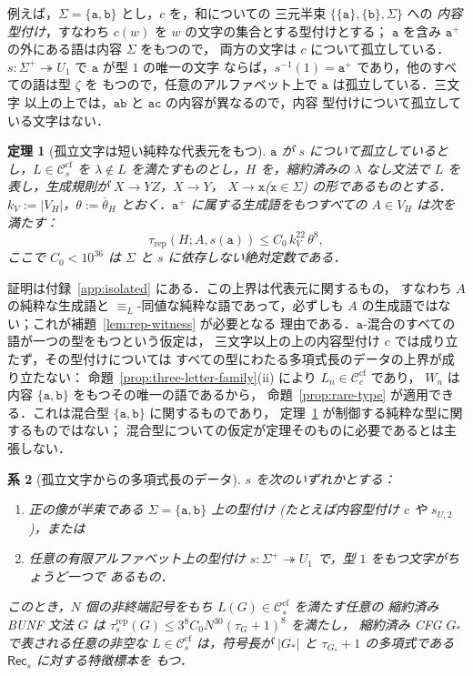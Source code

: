 \documentclass[11pt,a4paper]{ltjsarticle}
\numberwithin{equation}{section}
\theoremstyle{plain}
\newtheorem{theorem}{定理}[section]
\newtheorem{corollary}[theorem]{系}
\theoremstyle{definition}
\theoremstyle{remark}
\theoremstyle{plain}
\newcommand{\cf}{\mathrm{cf}}
\newcommand{\Ccf}[1]{\mathcal C_{#1}^{\cf}}
\newcommand{\Rec}{\mathsf{Rec}}
\newcommand{\trep}{\tau_{\mathrm{rep}}}
\begin{document}
例えば，$\Sigma=\{\mathtt a,\mathtt b\}$ とし，$c$ を，和についての
三元半束 $\{\{\mathtt a\},\{\mathtt b\},\Sigma\}$ への
\emph{内容型付け}，すなわち $c(w)$ を $w$ の文字の集合とする型付けとする；
$\mathtt a$ を含み $\mathtt a^+$ の外にある語は内容 $\Sigma$ をもつので，
両方の文字は $c$ について孤立している．
$s:\Sigma^+\twoheadrightarrow U_1$ で $\mathtt a$ が型 $1$ の唯一の文字
ならば，$s^{-1}(1)=\mathtt a^+$ であり，他のすべての語は型 $\zeta$ を
もつので，任意のアルファベット上で $\mathtt a$ は孤立している．三文字
以上の上では，$\mathtt{ab}$ と $\mathtt{ac}$ の内容が異なるので，内容
型付けについて孤立している文字はない．

\begin{theorem}[孤立文字は短い純粋な代表元をもつ]
\label{thm:isolated-letter}
$\mathtt a$ が $s$ について孤立しているとし，$L\in\Ccf{s}$ を
$\lambda\notin L$ を満たすものとし，$H$ を，縮約済みの $\lambda$ なし文法で
$L$ を表し，生成規則が $X\to YZ$，$X\to Y$，
$X\to\mathtt x$\textup($\mathtt x\in\Sigma$\textup) の形であるものとする．$k_V:=|V_H|$，$\theta:=\bar\theta_H$
とおく．$\mathtt a^+$ に属する生成語をもつすべての $A\in V_H$ は次を
満たす：
\[
 \trep(H;A,s(\mathtt a))\le C_0\,k_V^{22}\,\theta^{8},
\]
ここで $C_0<10^{36}$ は $\Sigma$ と $s$ に依存しない絶対定数である．
\end{theorem}

証明は付録~\ref{app:isolated} にある．この上界は代表元に関するもの，
すなわち $A$ の純粋な生成語と $\equiv_L$-同値な純粋な語であって，必ずしも
$A$ の生成語ではない；これが補題~\ref{lem:rep-witness} が必要となる
理由である．$\mathtt a$-混合のすべての語が一つの型をもつという仮定は，
三文字以上の上の内容型付け $c$ では成り立たず，その型付けについては
すべての型にわたる多項式長のデータの上界が成り立たない：
命題~\ref{prop:three-letter-family}(ii) により $L_n\in\Ccf{c}$ であり，
$W_n$ は内容 $\{\mathtt a,\mathtt b\}$ をもつその唯一の語であるから，
命題~\ref{prop:rare-type} が適用できる．これは混合型
$\{\mathtt a,\mathtt b\}$ に関するものであり，
定理~\ref{thm:isolated-letter} が制御する純粋な型に関するものではない；
混合型についての仮定が定理そのものに必要であるとは主張しない．

\begin{corollary}[孤立文字からの多項式長のデータ]
\label{cor:isolated-data}
$s$ を次のいずれかとする：
\begin{enumerate}[label=\textup{(\roman*)},leftmargin=*]
\item 正の像が半束である $\Sigma=\{\mathtt a,\mathtt b\}$ 上の型付け
\textup(たとえば内容型付け $c$ や $s_{U,2}$\textup)，または
\item 任意の有限アルファベット上の型付け
$s:\Sigma^+\twoheadrightarrow U_1$ で，型 $1$ をもつ文字がちょうど一つで
あるもの．
\end{enumerate}
このとき，$N$ 個の非終端記号をもち $L(G)\in\Ccf{s}$ を満たす任意の
縮約済み BUNF 文法 $G$ は
$\tau^{\mathrm{rep}}_s(G)\le3^8C_0N^{30}(\tau_G+1)^8$ を満たし，
縮約済み CFG $G_*$ で表される任意の非空な $L\in\Ccf{s}$ は，符号長が
$|G_*|$ と $\tau_{G_*}+1$ の多項式である $\Rec_s$ に対する特徴標本を
もつ．
\end{corollary}
\end{document}
